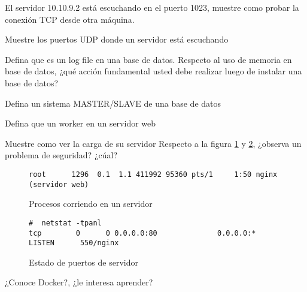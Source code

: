 \documentclass[12pt]{exam}
\begin{document}
\begin{questions}
\fillwithdottedlines{2em}
\vspace{1em}


\question El servidor 10.10.9.2 está escuchando en el puerto 1023, muestre como probar la conexión TCP desde otra máquina.
\fillwithdottedlines{2em}
\vspace{1em}

\question Muestre los puertos UDP donde un servidor está escuchando
\fillwithdottedlines{2em}
\vspace{1em}

\question Defina que es un log file en una base de datos.
\fillwithdottedlines{2em}
\vspace{1em}
\question Respecto al uso de memoria en base de datos, ¿qué acción fundamental usted debe realizar luego de instalar una base de datos?
\fillwithdottedlines{2em}
\vspace{1em}


\question Defina un sistema MASTER/SLAVE de una base de datos
\fillwithdottedlines{2em}
\vspace{1em}

\question Defina que un worker en un servidor web
\fillwithdottedlines{2em}
\vspace{1em}

\question Muestre como ver la carga de su servidor
\fillwithdottedlines{2em}
\vspace{1em}
\newpage
\question Respecto a la figura \ref{1} y \ref{2}, ¿observa un problema de seguridad? ¿cúal? 
\begin{figure*}[h]
\fillwithdottedlines{4em}
\vspace{1em}


\begin{lstlisting}
root      1296  0.1  1.1 411992 95360 pts/1     1:50 nginx	(servidor web)
\end{lstlisting}
\caption{Procesos corriendo en un servidor}
\label{1}
\end{figure*}


\begin{figure*}[h]

\begin{lstlisting}
#  netstat -tpanl
tcp        0      0 0.0.0.0:80              0.0.0.0:*               LISTEN      550/nginx	
\end{lstlisting}
\caption{Estado de puertos de servidor}
\label{2}

\end{figure*}

\question ¿Conoce Docker?, ¿le interesa aprender?
\fillwithdottedlines{4em}
\vspace{1em}

\end{questions}
\end{document}
